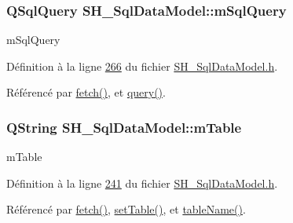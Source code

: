 \hypertarget{classSH__SqlDataModel_a54f0cf057e3200f6b199508958e43fec}{
\subsubsection[{m\-Sql\-Query}]{\setlength{\rightskip}{0pt plus 5cm}Q\-Sql\-Query S\-H\-\_\-\-Sql\-Data\-Model\-::m\-Sql\-Query\hspace{0.3cm}{\ttfamily [private]}}}\label{classSH__SqlDataModel_a54f0cf057e3200f6b199508958e43fec}


m\-Sql\-Query 



Définition à la ligne \hyperlink{SH__SqlDataModel_8h_source_l00266}{266} du fichier \hyperlink{SH__SqlDataModel_8h_source}{S\-H\-\_\-\-Sql\-Data\-Model.\-h}.



Référencé par \hyperlink{classSH__SqlDataModel_ab6c206088250a66ddc8cb8d33a38e421}{fetch()}, et \hyperlink{classSH__SqlDataModel_aee909d0a29715d02d920fcf854bfbba2}{query()}.

\hypertarget{classSH__SqlDataModel_a88b8738a0d2803c94295c90c83d65f32}{
\subsubsection[{m\-Table}]{\setlength{\rightskip}{0pt plus 5cm}Q\-String S\-H\-\_\-\-Sql\-Data\-Model\-::m\-Table\hspace{0.3cm}{\ttfamily [private]}}}\label{classSH__SqlDataModel_a88b8738a0d2803c94295c90c83d65f32}


m\-Table 



Définition à la ligne \hyperlink{SH__SqlDataModel_8h_source_l00241}{241} du fichier \hyperlink{SH__SqlDataModel_8h_source}{S\-H\-\_\-\-Sql\-Data\-Model.\-h}.



Référencé par \hyperlink{classSH__SqlDataModel_ab6c206088250a66ddc8cb8d33a38e421}{fetch()}, \hyperlink{classSH__SqlDataModel_a2c09d14926326a1149c1df7856c9879c}{set\-Table()}, et \hyperlink{classSH__SqlDataModel_afced07f7b9e6fecd349a5428a1a4615e}{table\-Name()}.



